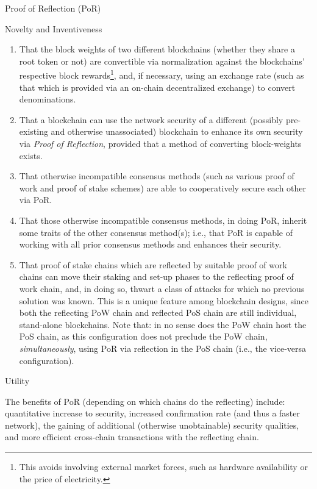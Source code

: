 \begin{section}{Proof of Reflection (PoR)}
\begin{subsection}{Novelty and Inventiveness}
     \begin{enumerate}
         \def\labelenumi{\arabic{enumi}.}
         \tightlist
         \item
               That the block weights of two different blockchains (whether they share a root token or not) are convertible via normalization against the blockchains' respective block rewards\footnote{This avoids involving external market forces, such as hardware availability or the price of electricity.}, and, if necessary, using an exchange rate (such as that which is provided via an on-chain decentralized exchange) to convert denominations.
         \item
               That a blockchain can use the network security of a different (possibly pre-existing and otherwise unassociated) blockchain to enhance its own security via \emph{Proof of Reflection}, provided that a method of converting block-weights exists.
         \item
               That otherwise incompatible consensus methods (such as various proof of work and proof of stake schemes) are able to cooperatively secure each other via PoR.
         \item
               That those otherwise incompatible consensus methods, in doing PoR, inherit some traits of the other consensus method(s); i.e., that PoR is capable of working with all prior consensus methods and enhances their security.
         \item
               That proof of stake chains which are reflected by suitable proof of work chains can move their staking and set-up phases to the reflecting proof of work chain, and, in doing so, thwart a class of attacks for which no previous solution was known. This is a unique feature among blockchain designs, since both the reflecting PoW chain and reflected PoS chain are still individual, stand-alone blockchains. Note that: in no sense does the PoW chain host the PoS chain, as this configuration does not preclude the PoW chain, \emph{simultaneously}, using PoR via reflection in the PoS chain (i.e., the vice-versa configuration).
     \end{enumerate}

 \end{subsection}
 \begin{subsection}{Utility}

     The benefits of PoR (depending on which chains do the reflecting) include: quantitative increase to security, increased confirmation rate (and thus a faster network), the gaining of additional (otherwise unobtainable) security qualities, and more efficient cross-chain transactions with the reflecting chain.

 \end{subsection}
\end{section}

